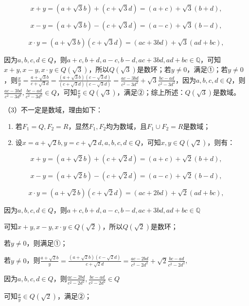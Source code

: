 \documentclass[11pt,a4paper]{ctexart}
\begin{document}
\[
x + y = (a + \sqrt {3} b) + (c + \sqrt {3} d) = (a + c) + \sqrt {3} (b + d),
\]

\[
x - y = (a + \sqrt {3} b) - (c + \sqrt {3} d) = (a - c) + \sqrt {3} (b - d),
\]

\[
x \cdot y = (a + \sqrt {3} b) (c + \sqrt {3} d) = (a c + 3 b d) + \sqrt {3} (a d + b c),
\]

因为\(a, b, c, d \in Q\)，则\(a+c,b+d,a-c,b-d,ac+3bd,ad+bc\in\mathbb Q\)，可知\(x + y, x - y, x \cdot y \in Q(\sqrt{3})\)，所以\(Q(\sqrt{3})\)是数环；若\(y\neq0\)，满足①；若\(y \neq 0\)，则\(\frac{x}{y}=\frac{a+\sqrt3b}{c+\sqrt3d} = \frac{(a + \sqrt{3}b)(c - \sqrt{3}d)}{(c + \sqrt{3}d)(c - \sqrt{3}d)} = \frac{ac - 3bd}{c^2 - 3d^2} + \sqrt{3}\frac{bc - ad}{c^2 - 3d^2}\)，因为\(a, b, c, d \in Q\)，则\(\frac{ac - 3bd}{c^2 - 3d^2}, \frac{bc - ad}{c^2 - 3d^2} \in Q\)，可知\(\frac{x}{y} \in Q(\sqrt{3})\)，满足②；综上所述：\(Q(\sqrt{3})\)是数域。

（3）不一定是数域，理由如下：

\begin{enumerate}[label=\arabic*., leftmargin=*]
\item 若\(F_{1} = Q, F_{2} = R\)，显然\(F_{1}, F_{2}\)均为数域，且\(F_{1} \cup F_{2} = R\)是数域；
\item
  设\(x = a + \sqrt{2}b, y = c + \sqrt{2}d, a, b, c, d \in Q\)，可知\(x, y \in Q(\sqrt{2})\)，则有：
\end{enumerate}

\[
x + y = (a + \sqrt {2} b) + (c + \sqrt {2} d) = (a + c) + \sqrt {2} (b + d),
\]

\[
x - y = (a + \sqrt {2} b) - (c + \sqrt {2} d) = (a - c) + \sqrt {2} (b - d),
\]

\[
x \cdot y = (a + \sqrt {2} b) (c + \sqrt {2} d) = (a c + 2 b d) + \sqrt {2} (a d + b c),
\]

因为\(a, b, c, d \in Q\)，则\(a+c,b+d,a-c,b-d,ac+3bd,ad+bc\in\mathbb Q\)

可知\(x + y, x - y, x \cdot y \in Q(\sqrt{2})\)，所以\(Q(\sqrt{2})\)是数环；

若\(y\neq0\)，则满足①；

若\(y \neq 0\)，则\(\frac{a + \sqrt{2}b}{y} = \frac{(a + \sqrt{2}b)(c - \sqrt{2}d)}{c + \sqrt{2}d} = \frac{ac - 2bd}{c^2 - 2d^2} + \sqrt{2}\frac{bc - ad}{c^2 - 2d^2}\),

因为\(a, b, c, d \in Q\)，则\(\frac{ac - 2bd}{c^2 - 2d^2}, \frac{bc - ad}{c^2 - 2d^2} \in Q\)

可知\(\frac{x}{y} \in Q(\sqrt{2})\)，满足②；
\end{document}
